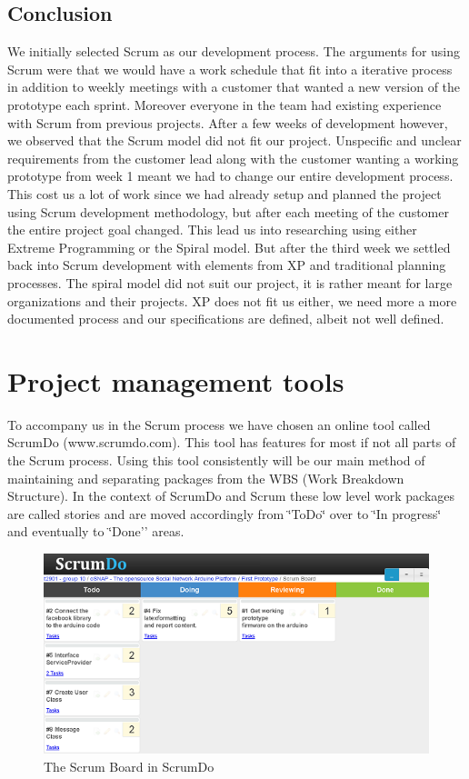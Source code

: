 \subsection{Conclusion}
We initially selected Scrum as our development process. The arguments  for using Scrum were that we would
have a work schedule that fit into a iterative process in addition to weekly meetings with a customer that
wanted a new version of the prototype each sprint. Moreover everyone in the team had existing experience 
with Scrum from previous projects. After a few weeks of development however, we observed that the Scrum
model did not fit our project. Unspecific and unclear requirements from the customer lead along with
the customer wanting a working prototype from week 1 meant we had to change our entire development
process. This cost us a lot of work since we had already setup and planned the project using Scrum 
development methodology, but after each meeting of the customer the entire project goal changed. This
lead us into researching using either Extreme Programming or the Spiral model. But after the third week we
settled back into Scrum development with elements from XP and traditional planning processes.  The spiral model did not suit our project, it is rather meant for large organizations and their projects. XP does not fit us either, we need more a more documented process and our specifications are defined, albeit not well defined. 

\section{Project management tools}

To accompany us in the Scrum process we have chosen an online tool
called ScrumDo (www.scrumdo.com). This tool has features for most
if not all parts of the Scrum process. Using this tool consistently
will be our main method of maintaining and separating packages from
the WBS (Work Breakdown Structure). In the context of ScrumDo and
Scrum these low level work packages are called stories and are moved
accordingly from \char`\"{}ToDo\char`\"{} over to \char`\"{}In progress\char`\"{}
and eventually to \char`\"{}Done'' areas.
	
\begin{figure}[h!]
\centering \includegraphics{img/mgmt-scrumdo} \caption{The Scrum Board in ScrumDo}
\label{fig:mgmt-scrumdo}
\end{figure}


